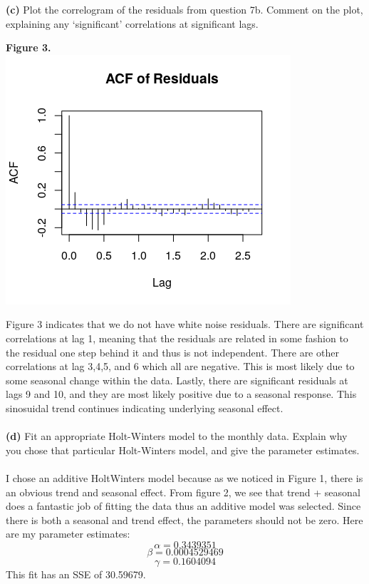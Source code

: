 \documentclass[11pt]{article}
\begin{document}
\textbf{(c)} Plot the correlogram of the residuals from question 7b. Comment on the plot, explaining any ‘significant’ correlations at significant lags.
\begin{center}
\textbf{Figure 3.} \\
\includegraphics[scale=1]{res}
\end{center}
Figure 3 indicates that we do not have white noise residuals. There are significant correlations at lag 1, meaning that the residuals are related in some fashion to the residual one step behind it and thus is not independent. There are other correlations at lag 3,4,5, and 6 which all are negative. This is most likely due to some seasonal change within the data. Lastly, there are significant residuals at lags 9 and 10, and they are most likely positive due to a seasonal response. This sinosuidal trend continues indicating underlying seasonal effect.
\\\\
\textbf{(d)} Fit an appropriate Holt-Winters model to the monthly data. Explain why you chose that particular Holt-Winters model, and give the parameter estimates.
\\\\
I chose an additive HoltWinters model because as we noticed in Figure 1, there is an obvious trend and seasonal effect. From figure 2, we see that trend + seasonal does a fantastic job of fitting the data thus an additive model was selected. Since there is both a seasonal and trend effect, the parameters should not be zero. Here are my parameter estimates:
$$ \alpha = 0.3439351 $$
$$ \beta = 0.0004529469 $$
$$ \gamma = 0.1604094 $$
This fit has an SSE of 30.59679.
\\\\
\end{document}
